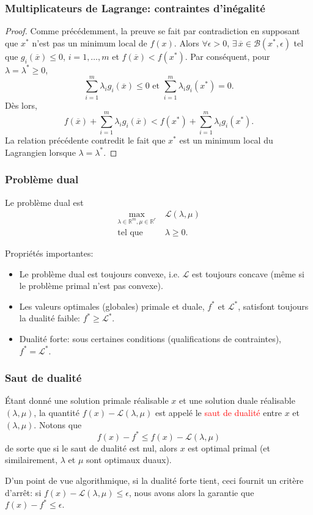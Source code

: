 \documentclass[usepdftitle=false,aspectratio=169]{beamer}
\def\blue{\color{blue}}
\def\cB{\mathcal{B}}
\def\cL{\mathcal{L}}
\def\RR{\mathbb{R}}
\begin{document}
\begin{frame}
\frametitle{Multiplicateurs de Lagrange: contraintes d'inégalité}
	
\begin{proof}
Comme précédemment, la preuve se fait par contradiction en supposant que $x^*$ n'est pas un minimum local de $f(x)$.
Alors $\forall \epsilon > 0$, $\exists\, \overline{x} \in \cB(x^*, \epsilon)$ tel que $g_i(\overline{x}) \leq 0$, $i = 1,\ldots,m$ et $f(\overline{x}) < f(x^*)$.
Par conséquent, pour $\lambda = \lambda^* \geq 0$,
$$
\sum_{i = 1}^{m} \lambda_i g_i(\overline{x}) \leq 0 \mbox{ et }
\sum_{i = 1}^{m} \lambda_i g_i(x^*) = 0.
$$
Dès lors,
$$
f(\overline{x}) + \sum_{i = 1}^{m} \lambda_i g_i(\overline{x}) < f(x^*) + \sum_{i = 1}^{m} \lambda_i g_i(x^*).
$$
La relation précédente contredit le fait que $x^*$ est un
minimum local du Lagrangien lorsque $\lambda = \lambda^*$.
\end{proof}

\end{frame}

\begin{frame}
\frametitle{Problème dual}

Le problème dual est
\begin{align*}
\max_{\lambda \in \RR^m, \mu \in \RR^r}\ & \cL(\lambda, \mu) \\
\mbox{tel que } & \lambda \geq 0.
\end{align*}

Propriétés importantes:
\begin{itemize}
\item
Le problème dual est toujours convexe, i.e. $\cL$ est toujours concave (même si le problème primal n'est pas convexe).
\item
Les valeurs optimales (globales) primale et duale, $f^*$ et $\cL^*$, satisfont toujours la dualité faible: $f^* \geq \cL^*$.
\item {\blue Dualité forte}: sous certaines conditions (qualifications de contraintes), $f^* = \cL^*$.
\end{itemize}

\end{frame}

\begin{frame}
\frametitle{Saut de dualité}

Étant donné une solution primale réalisable $x$ et une solution duale réalisable $(\lambda, \mu)$, la quantité $f(x) - \cL(\lambda, \mu)$ est appelé le \textcolor{red}{saut de dualité} entre $x$ et $(\lambda, \mu)$.
Notons que
$$
f(x) - f^* \leq f(x) - \cL(\lambda, \mu)
$$
de sorte que si le saut de dualité est nul, alors $x$ est optimal primal (et similairement, $\lambda$ et $\mu$ sont optimaux duaux).

\mbox{}

D'un point de vue algorithmique, si la dualité forte tient, ceci fournit un critère d'arrêt: si $f(x) - \cL(\lambda, \mu) \leq \epsilon$, nous avons alors la garantie que $f(x) - f^* \leq \epsilon$.

\end{frame}
\end{document}
